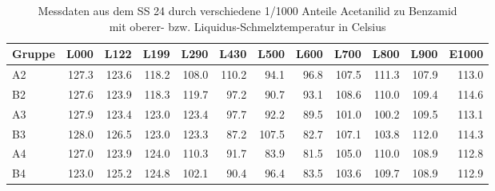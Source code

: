 \begin{table}[h]
\centering \begin{tabular}{lrrrrrrrrrrr}
\toprule
Gruppe & L000 & L122 & L199 & L290 & L430 & L500 & L600 & L700 & L800 & L900 & E1000 \\
\midrule
A2 & 127.3 & 123.6 & 118.2 & 108.0 & 110.2 & 94.1 & 96.8 & 107.5 & 111.3 & 107.9 & 113.0 \\
B2 & 127.6 & 123.9 & 118.3 & 119.7 & 97.2 & 90.7 & 93.1 & 108.6 & 110.0 & 109.4 & 114.6 \\
A3 & 127.9 & 123.4 & 123.0 & 123.4 & 97.7 & 92.2 & 89.5 & 101.0 & 100.2 & 109.5 & 113.1 \\
B3 & 128.0 & 126.5 & 123.0 & 123.3 & 87.2 & 107.5 & 82.7 & 107.1 & 103.8 & 112.0 & 114.3 \\
A4 & 127.0 & 123.9 & 124.0 & 110.3 & 91.7 & 83.9 & 81.5 & 105.0 & 110.0 & 108.9 & 112.8 \\
B4 & 123.0 & 125.2 & 124.8 & 102.1 & 90.4 & 96.4 & 83.5 & 103.6 & 109.7 & 108.9 & 112.9 \\
\bottomrule
\end{tabular}
\caption{Messdaten aus dem SS 24 durch verschiedene 1/1000 Anteile Acetanilid zu Benzamid\\mit oberer- bzw. Liquidus-Schmelztemperatur in Celsius}
\end{table}
\newpage